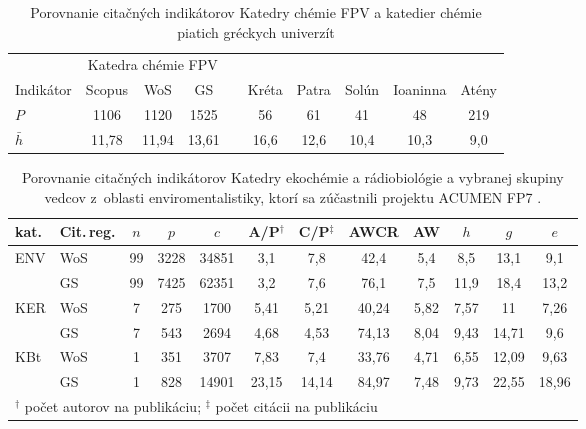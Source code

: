 \begin{table}
  \centering\small
  \caption[Porovnanie KCh FPV a chemických katedier vybraných gréckych
  univerzít]%
  {Porovnanie citačných indikátorov Katedry chémie FPV a katedier chémie piatich
    gréckych univerzít \citep{Lazaridis2010}}
  \label{tab:kazakis.results2}
  \begin{tabularx}{\textwidth}{Xccclccccc}
    \toprule\noalign{\vspace{.5ex}}
    & \multicolumn{3}{c}{Katedra chémie FPV} & \phantom{M} & \multicolumn{5}{c}{\citet{Kazakis2015}} \\
    \cmidrule{2-4}\cmidrule{5-9}
    Indikátor & Scopus & WoS & GS & & Kréta & Patra & Solún & Ioaninna & Atény \\[0.3ex]
    \midrule\noalign{\vspace{.5ex}}
    $P$       & 1106  & 1120  & 1525  & & 56   & 61   & 41   & 48   & 219 \\
    $\bar{h}$ & 11,78 & 11,94 & 13,61 & & 16,6 & 12,6 & 10,4 & 10,3 & 9,0 \\[0.5ex]
    \bottomrule
  \end{tabularx}
\end{table}

\begin{table}
  \centering\small
  \caption[Porovnanie KEB, KBt a vybranej skupiny enviromentalistov]%
  {Porovnanie citačných indikátorov Katedry ekochémie a rádiobiológie a vybranej
    skupiny vedcov z~oblasti enviromentalistiky, ktorí sa zúčastnili projektu
    ACUMEN FP7 \citep{Wildgaard2015}.}
  \label{tab:kazakis.results3}
  \begin{tabularx}{\textwidth}{Xlcccccccccc}
    \toprule\noalign{\vspace{.3ex}}
    kat. &Cit.\,reg. & $n$ & $p$ & $c$ & A/P$^\dagger$ & C/P$^\ddagger$ & AWCR & AW & $h$ & $g$ & $e$ \\[0.3ex]
    \midrule\noalign{\vspace{.5ex}}
    ENV & WoS & 99 & 3228 & 34851 & 3,1   & 7,8   & 42,4  & 5,4  & 8,5  & 13,1  & 9,1   \\
        & GS  & 99 & 7425 & 62351 & 3,2   & 7,6   & 76,1  & 7,5  & 11,9 & 18,4  & 13,2  \\[2ex]
    KER & WoS & 7  & 275  & 1700  & 5,41  & 5,21  & 40,24 & 5,82 & 7,57 & 11    & 7,26  \\
        & GS  & 7  & 543  & 2694  & 4,68  & 4,53  & 74,13 & 8,04 & 9,43 & 14,71 & 9,6   \\[2ex]
    KBt & WoS & 1  & 351  & 3707  & 7,83  & 7,4   & 33,76 & 4,71 & 6,55 & 12,09 & 9,63  \\
        & GS  & 1  & 828  & 14901 & 23,15 & 14,14 & 84,97 & 7,48 & 9,73 & 22,55 & 18,96 \\[0.5ex]
    \bottomrule

    \multicolumn{12}{l}{\footnotesize $^\dagger$ počet autorov na publikáciu; $^\ddagger$ počet citácii na publikáciu} \\
  \end{tabularx}
\end{table}


